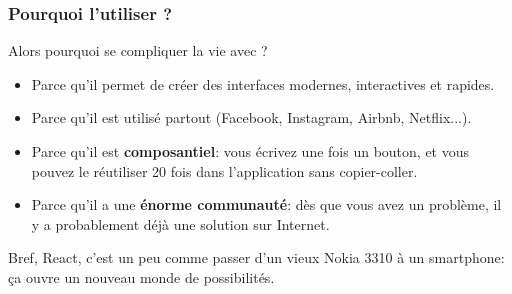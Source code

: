 \subsubsection[Pourquoi l'utiliser ?]{Pourquoi l'utiliser ?}

Alors pourquoi se compliquer la vie avec \react{}?

\begin{itemize}
    \item Parce qu’il permet de créer des interfaces modernes, interactives et rapides.
    \item Parce qu’il est utilisé partout (Facebook, Instagram, Airbnb, Netflix...).
    \item Parce qu’il est \textbf{composantiel}: vous écrivez une fois un bouton, et vous pouvez le réutiliser 20 fois dans l’application sans copier-coller.
    \item Parce qu’il a une \textbf{énorme communauté}: dès que vous avez un problème, il y a probablement déjà une solution sur Internet.
\end{itemize}

Bref, React, c’est un peu comme passer d’un vieux Nokia 3310 à un smartphone: ça ouvre un nouveau monde de possibilités. 